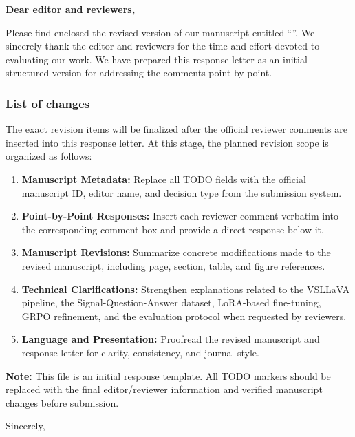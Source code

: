 \thispagestyle{empty}
\noindent \textbf{Dear editor and reviewers,}

Please find enclosed the revised version of our manuscript entitled \enquote{\thetitle}. We sincerely thank the editor and reviewers for the time and effort devoted to evaluating our work. We have prepared this response letter as an initial structured version for addressing the comments point by point.

\subsubsection*{List of changes}
The exact revision items will be finalized after the official reviewer comments are inserted into this response letter. At this stage, the planned revision scope is organized as follows:

\begin{enumerate}
    \item \textbf{Manuscript Metadata:} Replace all TODO fields with the official manuscript ID, editor name, and decision type from the submission system.
    \item \textbf{Point-by-Point Responses:} Insert each reviewer comment verbatim into the corresponding comment box and provide a direct response below it.
    \item \textbf{Manuscript Revisions:} Summarize concrete modifications made to the revised manuscript, including page, section, table, and figure references.
    \item \textbf{Technical Clarifications:} Strengthen explanations related to the VSLLaVA pipeline, the Signal-Question-Answer dataset, LoRA-based fine-tuning, GRPO refinement, and the evaluation protocol when requested by reviewers.
    \item \textbf{Language and Presentation:} Proofread the revised manuscript and response letter for clarity, consistency, and journal style.
\end{enumerate}

\textbf{Note:} This file is an initial response template. All TODO markers should be replaced with the final editor/reviewer information and verified manuscript changes before submission.

\vspace{8em}

\noindent Sincerely,

\noindent\theauthor

\vfill
